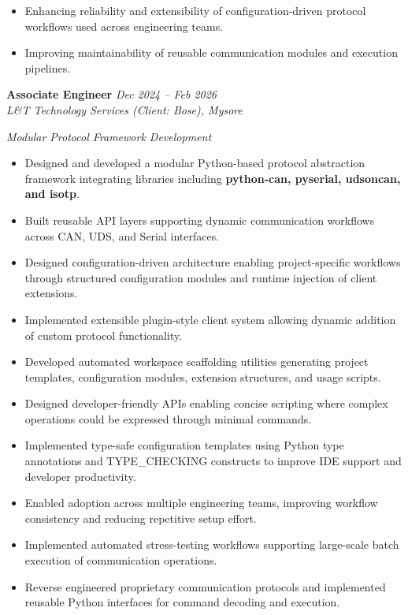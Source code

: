 \documentclass[a4paper,10pt]{article}
\begin{document}
\begin{itemize}

\item Enhancing reliability and extensibility of configuration-driven protocol workflows used across engineering teams.

\item Improving maintainability of reusable communication modules and execution pipelines.

\end{itemize}

\vspace{3pt}

\noindent
\textbf{Associate Engineer} \hfill \textit{Dec 2024 -- Feb 2026} \\
\textit{L\&T Technology Services (Client: Bose), Mysore}

\textit{Modular Protocol Framework Development}

\begin{itemize}

\item Designed and developed a modular Python-based protocol abstraction framework integrating libraries including \textbf{python-can, pyserial, udsoncan, and isotp}.

\item Built reusable API layers supporting dynamic communication workflows across CAN, UDS, and Serial interfaces.

\item Designed configuration-driven architecture enabling project-specific workflows through structured configuration modules and runtime injection of client extensions.

\item Implemented extensible plugin-style client system allowing dynamic addition of custom protocol functionality.

\item Developed automated workspace scaffolding utilities generating project templates, configuration modules, extension structures, and usage scripts.

\item Designed developer-friendly APIs enabling concise scripting where complex operations could be expressed through minimal commands.

\item Implemented type-safe configuration templates using Python type annotations and TYPE\_CHECKING constructs to improve IDE support and developer productivity.

\item Enabled adoption across multiple engineering teams, improving workflow consistency and reducing repetitive setup effort.

\item Implemented automated stress-testing workflows supporting large-scale batch execution of communication operations.

\item Reverse engineered proprietary communication protocols and implemented reusable Python interfaces for command decoding and execution.

\end{itemize}
\end{document}
